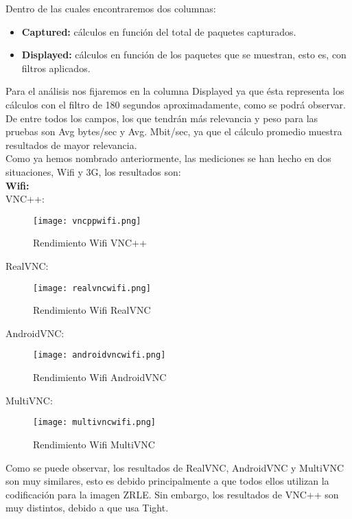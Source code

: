 Dentro de las cuales encontraremos dos columnas:
\begin{itemize}
\item \textbf{Captured:} cálculos en función del total de paquetes capturados.
\item \textbf{Displayed:} cálculos en función de los paquetes que se muestran, esto es, con filtros aplicados.
\end{itemize}

Para el análisis nos fijaremos en la columna Displayed ya que ésta representa los cálculos con el filtro de 180 segundos aproximadamente, como se podrá observar. De entre todos los campos, los que tendrán más relevancia y peso para las pruebas son Avg bytes/sec y Avg. Mbit/sec, ya que el cálculo promedio muestra resultados de mayor relevancia.\\
\newpage
Como ya hemos nombrado anteriormente, las mediciones se han hecho en dos situaciones, Wifi y 3G, los resultados son:\\

\textbf{Wifi:}\\

VNC++:
\begin{figure}[h]
\begin{flushleft}
\texttt{[image: vncppwifi.png]}
\end{flushleft}
\caption{Rendimiento Wifi VNC++}
\end{figure}

RealVNC:
\begin{figure}[h]
\begin{flushleft}
\texttt{[image: realvncwifi.png]}
\end{flushleft}
\caption{Rendimiento Wifi RealVNC}
\end{figure}

AndroidVNC:
\begin{figure}[h]
\begin{flushleft}
\texttt{[image: androidvncwifi.png]}
\end{flushleft}
\caption{Rendimiento Wifi AndroidVNC}
\end{figure}
\newpage
MultiVNC:
\begin{figure}[h]
\begin{flushleft}
\texttt{[image: multivncwifi.png]}
\end{flushleft}
\caption{Rendimiento Wifi MultiVNC}
\end{figure}

Como se puede observar, los resultados de RealVNC, AndroidVNC y MultiVNC son muy similares, esto es debido principalmente a que todos ellos utilizan la codificación para la imagen ZRLE. Sin embargo, los resultados de VNC++ son muy distintos, debido a que usa Tight.\\

